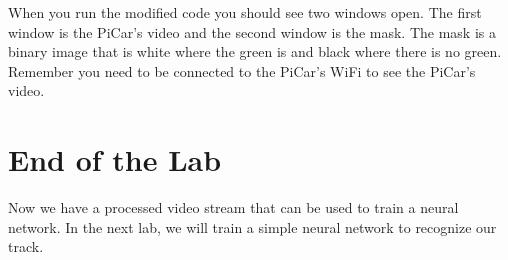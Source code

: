 \documentclass[12pt]{report}
\begin{document}
When you run the modified code you should see two windows open. The first window is the PiCar's video and the second window is the mask. The mask is a binary image that is white where the green is and black where there is no green. Remember you need to be connected to the PiCar's WiFi to see the PiCar's video.


\chapter{End of the Lab}
Now we have a processed video stream that can be used to train a neural network. In the next lab, we will train a simple neural network to recognize our track.
\end{document}
